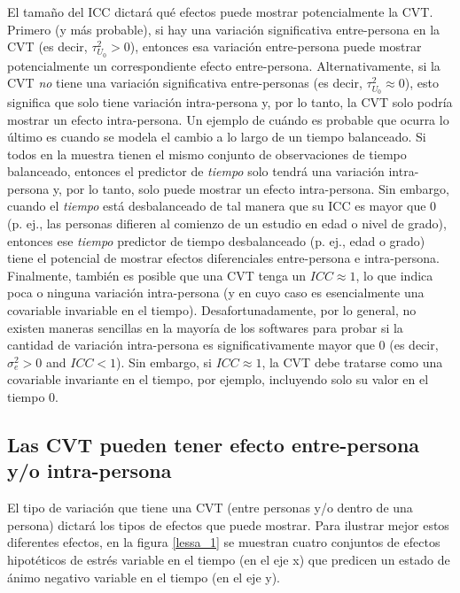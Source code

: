 \documentclass[spanish]{article}
\numberwithin{figure}{subsection}
\numberwithin{equation}{subsection}
\numberwithin{table}{subsection}
\begin{document}
El tamaño del ICC dictará qué efectos puede mostrar potencialmente la CVT. Primero (y más probable), si hay una variación
significativa entre-persona en la CVT (es decir, $\tau^2_{U_0} > 0$), entonces esa variación entre-persona puede mostrar
potencialmente un correspondiente efecto entre-persona. Alternativamente, si la CVT \textit{no} tiene una variación significativa
entre-personas (es decir, $\tau^2_{U_0} \approx 0$), esto significa que solo tiene variación intra-persona y, por lo tanto,
la CVT solo podría mostrar un efecto intra-persona. Un ejemplo de cuándo es probable que ocurra lo último es cuando se modela
el cambio a lo largo de un tiempo balanceado. Si todos en la muestra tienen el mismo conjunto de observaciones de tiempo
balanceado, entonces el predictor de \textit{tiempo} solo tendrá una variación intra-persona y, por lo tanto,
solo puede mostrar un efecto intra-persona. Sin embargo, cuando el \textit{tiempo} está desbalanceado de tal manera que su
ICC es mayor que 0 (p. ej., las personas difieren al comienzo de un estudio en edad o nivel de grado), entonces ese \textit{tiempo}
predictor de tiempo desbalanceado (p. ej., edad o grado) tiene el potencial de mostrar efectos diferenciales entre-persona
e intra-persona. Finalmente, también es posible que una CVT tenga un $ICC \approx 1$, lo que indica poca o ninguna variación
intra-persona (y en cuyo caso es esencialmente una covariable invariable en el tiempo). Desafortunadamente, por lo general,
no existen maneras sencillas en la mayoría de los softwares para probar si la cantidad de variación intra-persona es
significativamente mayor que 0 (es decir, $\sigma^2_e > 0$ and $ICC < 1$). Sin embargo, si $ICC \approx 1$, la CVT debe
tratarse como una covariable invariante en el tiempo, por ejemplo, incluyendo solo su valor en el tiempo 0.

\subsection{Las CVT pueden tener efecto entre-persona y/o intra-persona}

El tipo de variación que tiene una CVT (entre personas y/o dentro de una persona) dictará los tipos de efectos que puede
mostrar. Para ilustrar mejor estos diferentes efectos, en la figura \ref{lessa_1} se muestran cuatro conjuntos de efectos hipotéticos
de estrés variable en el tiempo (en el eje x) que predicen un estado de ánimo negativo variable en el tiempo (en el eje y).
\end{document}
